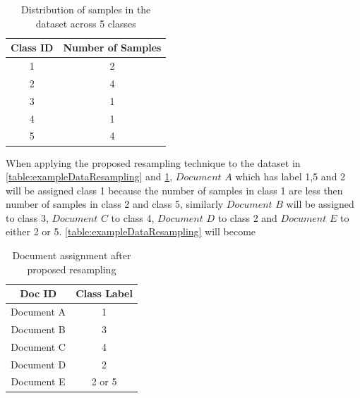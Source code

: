 \begin{table}[!ht]
\centering
\begin{tabular}{cc}
\hline
\textbf{Class ID} & \textbf{Number of Samples} \\ \hline
1                 & 2                         \\ 
2                 & 4                          \\ 
3                 & 1                          \\ 
4                 & 1                          \\ 
5                 & 4                         \\ \hline
\end{tabular}
\captionsetup{justification=centering,margin=1cm}
\caption{Distribution of samples in the dataset across 5 classes}
\label{table:SamplesDistributionDataResamplingExample}
\end{table}

When applying the proposed resampling technique to the dataset in \ref{table:exampleDataResampling} and  \ref{table:SamplesDistributionDataResamplingExample}, $Document$ $A$ which has label 1,5 and 2 will be assigned class 1 because the number of samples in class 1 are less then number of samples in class 2 and class 5, similarly $Document$ $B$ will be assigned to class 3, $Document$ $C$  to class 4, $Document$ $D$ to class 2 and $Document$ $E$ to either 2 or 5. \ref{table:exampleDataResampling} will become

\begin{table}[!ht]
\centering
\begin{tabular}{cc}

\hline
\textbf{Doc ID} & \textbf{Class Label} \\ \hline
Document A           & 1                \\ 
Document B           & 3                    \\ 
Document C           & 4                  \\ 
Document D           & 2                   \\ 
Document E           & 2 or 5                  \\ \hline
\end{tabular}
\captionsetup{justification=centering,margin=1cm}
\caption{Document assignment after proposed resampling}
\label{table:exampleDataResamplingAfterResampling}
\end{table}

